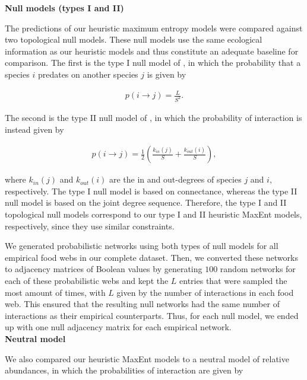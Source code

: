\begin{box3.2}

\textbf{Null models (types I and II)}

The predictions of our heuristic maximum entropy models were compared against
two topological null models. These null models use the same ecological
information as our heuristic models and thus constitute an adequate baseline for
comparison. The first is the type I null model of \textcite{Fortuna2006Habitat}, in
which the probability that a species $i$ predates on another species $j$ is
given by
  
\begin{eqnarray}
\label{eq:type1null}
    p(i \rightarrow j) = \frac{L}{S^2}.
\end{eqnarray}
  
The second is the type II null model of \textcite{Bascompte2003Nested}, in which
the probability of interaction is instead given by 
  
\begin{eqnarray}
\label{eq:type2null}
    p(i \rightarrow j) = \frac{1}{2} \left(\frac{k_{in}(j)}{S} +
    \frac{k_{out}(i)}{S}\right),
\end{eqnarray}
  
where $k_{in}(j)$ and $k_{out}(i)$ are the in and out-degrees of species $j$ and
$i$, respectively. The type I null model is based on connectance, whereas the
type II null model is based on the joint degree sequence. Therefore, the type I
and II topological null models correspond to our type I and II heuristic MaxEnt
models, respectively, since they use similar constraints. 
  
We generated probabilistic networks using both types of null models for all
empirical food webs in our complete dataset. Then, we converted these networks
to adjacency matrices of Boolean values by generating $100$ random networks for
each of these probabilistic webs and kept the $L$ entries that were sampled the
most amount of times, with $L$ given by the number of interactions in each food
web. This ensured that the resulting null networks had the same number of
interactions as their empirical counterparts. Thus, for each null model, we
ended up with one null adjacency matrix for each empirical network. \\

\textbf{Neutral model}
  
We also compared our heuristic MaxEnt models to a neutral model of relative
abundances, in which the probabilities of interaction are given by
  

\end{box3.2}
